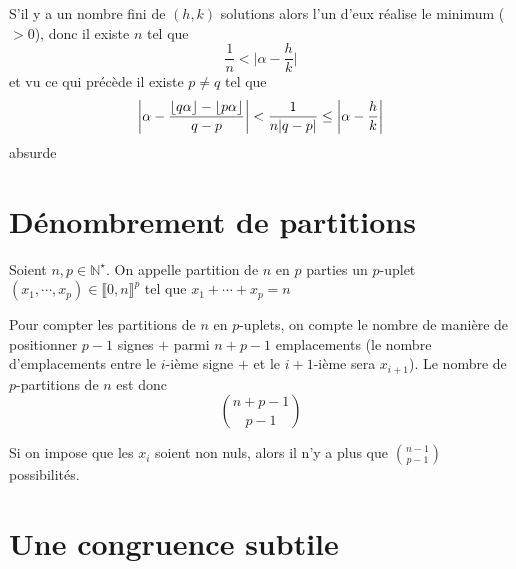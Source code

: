 S'il y a un nombre fini de $(h, k)$ solutions alors l'un d'eux réalise le minimum ($>0$), donc il existe $n$ tel que \[
    \frac1n<\Big|\alpha-\frac hk\Big|
\]
et vu ce qui précède il existe $p\neq q$ tel que \[
    \left| \alpha-\frac{\left\lfloor q\alpha\right\rfloor-\left\lfloor p\alpha\right\rfloor}{q-p} \right|<\frac1{n|q-p|}\leq \left| \alpha-\frac hk \right|
\]
absurde

\section{Dénombrement de partitions}

Soient $n, p\in\mathbb N^\star$. On appelle partition de $n$ en $p$ parties un $p$-uplet $(x_1, \cdots, x_p)\in\llbracket 0, n\rrbracket ^p$ tel que $x_1+\cdots +x_p=n$

Pour compter les partitions de $n$ en $p$-uplets, on compte le nombre de manière de positionner $p-1$ signes $+$ parmi $n+p-1$ emplacements (le nombre d'emplacements entre le $i$-ième signe $+$ et le $i+1$-ième sera $x_{i+1}$). Le nombre de $p$-partitions de $n$ est donc \[
    \binom{n+p-1}{p-1}
\]

Si on impose que les $x_i$ soient non nuls, alors il n'y a plus que $\displaystyle\binom{n-1}{p-1}$ possibilités.

\section{Une congruence subtile}

